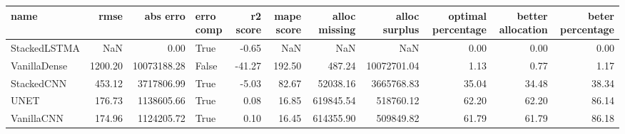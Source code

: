 \begin{tabular}{lrrlrrrrrrr}
\toprule
name & rmse & abs erro & erro comp & r2 score & mape score & alloc missing & alloc surplus & optimal percentage & better allocation & beter percentage \\
\midrule
StackedLSTMA & NaN & 0.00 & True & -0.65 & NaN & NaN & NaN & 0.00 & 0.00 & 0.00 \\
VanillaDense & 1200.20 & 10073188.28 & False & -41.27 & 192.50 & 487.24 & 10072701.04 & 1.13 & 0.77 & 1.17 \\
StackedCNN & 453.12 & 3717806.99 & True & -5.03 & 82.67 & 52038.16 & 3665768.83 & 35.04 & 34.48 & 38.34 \\
UNET & 176.73 & 1138605.66 & True & 0.08 & 16.85 & 619845.54 & 518760.12 & 62.20 & 62.20 & 86.14 \\
VanillaCNN & 174.96 & 1124205.72 & True & 0.10 & 16.45 & 614355.90 & 509849.82 & 61.79 & 61.79 & 86.18 \\
\bottomrule
\end{tabular}
